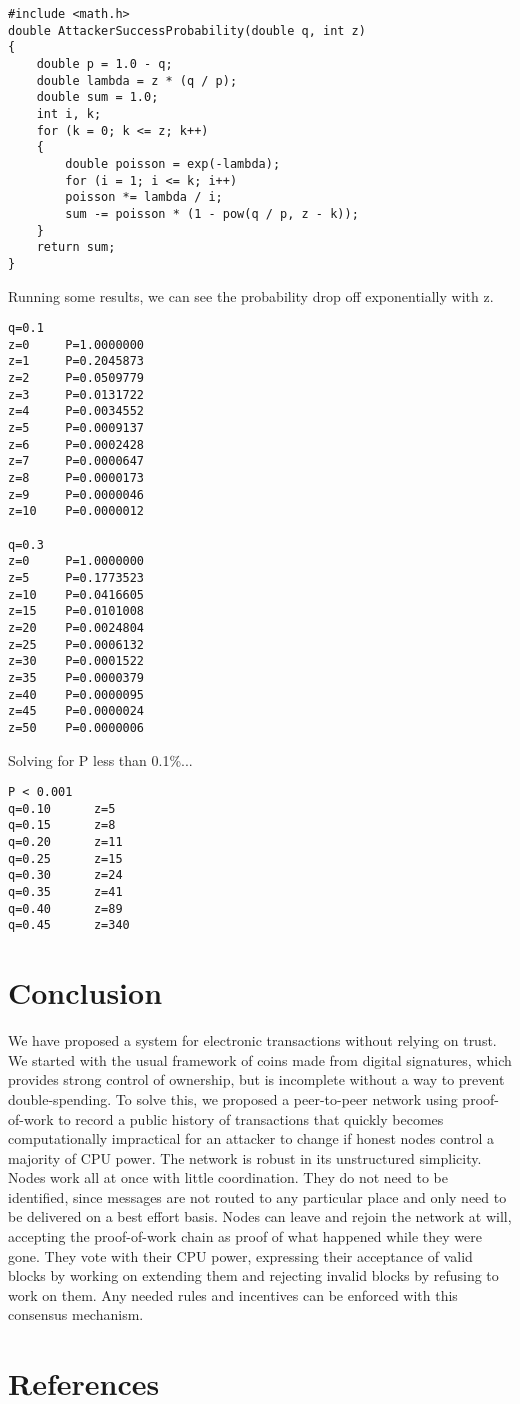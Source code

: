 \documentclass{article}
\begin{document}
\begin{verbatim}
#include <math.h>
double AttackerSuccessProbability(double q, int z)
{
    double p = 1.0 - q;
    double lambda = z * (q / p);
    double sum = 1.0;
    int i, k;
    for (k = 0; k <= z; k++)
    {
        double poisson = exp(-lambda);
        for (i = 1; i <= k; i++)
        poisson *= lambda / i;
        sum -= poisson * (1 - pow(q / p, z - k));
    }
    return sum;
}
\end{verbatim}

Running some results, we can see the probability drop off exponentially with z. \\

\begin{verbatim}
q=0.1
z=0     P=1.0000000
z=1     P=0.2045873
z=2     P=0.0509779
z=3     P=0.0131722
z=4     P=0.0034552
z=5     P=0.0009137
z=6     P=0.0002428
z=7     P=0.0000647
z=8     P=0.0000173
z=9     P=0.0000046
z=10    P=0.0000012

q=0.3
z=0     P=1.0000000
z=5     P=0.1773523
z=10    P=0.0416605
z=15    P=0.0101008
z=20    P=0.0024804
z=25    P=0.0006132
z=30    P=0.0001522
z=35    P=0.0000379
z=40    P=0.0000095
z=45    P=0.0000024
z=50    P=0.0000006
\end{verbatim}

Solving for P less than 0.1\%... \\

\begin{verbatim}
P < 0.001
q=0.10      z=5
q=0.15      z=8
q=0.20      z=11
q=0.25      z=15
q=0.30      z=24
q=0.35      z=41
q=0.40      z=89
q=0.45      z=340
\end{verbatim}

\section{Conclusion}\label{sec:conclusion}

We have proposed a system for electronic transactions without relying on trust. We started with
the usual framework of coins made from digital signatures, which provides strong control of
ownership, but is incomplete without a way to prevent double-spending. To solve this, we
proposed a peer-to-peer network using proof-of-work to record a public history of transactions
that quickly becomes computationally impractical for an attacker to change if honest nodes
control a majority of CPU power. The network is robust in its unstructured simplicity. Nodes
work all at once with little coordination. They do not need to be identified, since messages are
not routed to any particular place and only need to be delivered on a best effort basis. Nodes can
leave and rejoin the network at will, accepting the proof-of-work chain as proof of what
happened while they were gone. They vote with their CPU power, expressing their acceptance of
valid blocks by working on extending them and rejecting invalid blocks by refusing to work on
them. Any needed rules and incentives can be enforced with this consensus mechanism.

\section{References}\label{sec:references}
\end{document}
